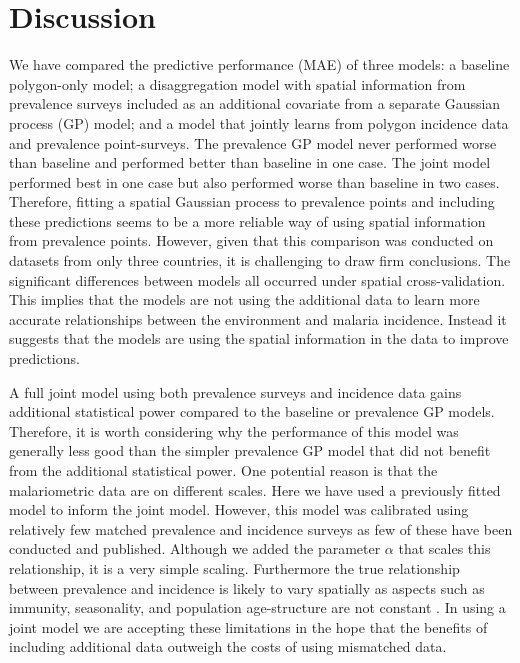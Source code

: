 \documentclass{statsoc}
\begin{document}
\section*{Discussion}



We have compared the predictive performance (MAE) of three models: a baseline polygon-only model; a disaggregation model with spatial information from prevalence surveys included as an additional covariate from a separate Gaussian process (GP) model; and a model that jointly learns from polygon incidence data and prevalence point-surveys.
The prevalence GP model never performed worse than baseline and performed better than baseline in one case.
The joint model performed best in one case but also performed worse than baseline in two cases.
Therefore, fitting a spatial Gaussian process to prevalence points and including these predictions seems to be a more reliable way of using spatial information from prevalence points.
However, given that this comparison was conducted on datasets from only three countries, it is challenging to draw firm conclusions.
The significant differences between models all occurred under spatial cross-validation.
This implies that the models are not using the additional data to learn more accurate relationships between the environment and malaria incidence. 
Instead it suggests that the models are using the spatial information in the data to improve predictions.


A full joint model using both prevalence surveys and incidence data gains additional statistical power compared to the baseline or prevalence GP models.
Therefore, it is worth considering why the performance of this model was generally less good than the simpler prevalence GP model that did not benefit from the additional statistical power.
One potential reason is that the malariometric data are on different scales.
Here we have used a previously fitted model \citep{cameron2015defining} to inform the joint model.
However, this model was calibrated using relatively few matched prevalence and incidence surveys as few of these have been conducted and published.
Although we added the parameter $\alpha$ that scales this relationship, it is a very simple scaling.
Furthermore the true relationship between prevalence and incidence is likely to vary spatially as aspects such as immunity, seasonality, and population age-structure are not constant \citep{cameron2015defining, battle2015defining, reiner2015seasonality}.
In using a joint model we are accepting these limitations in the hope that the benefits of including additional data outweigh the costs of using mismatched data.
\end{document}
